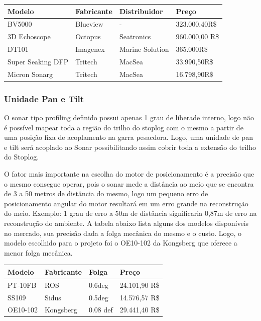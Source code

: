 \begin{center}
    \begin{tabular}{| l | l | l | l | }
    \hline
	{\bf Modelo} & 	{\bf Fabricante} &		{\bf Distribuidor}	&	{\bf Preço} \\  \hline
	BV5000 &			Blueview&				- &					323.000,40R{\$} \\  \hline
	3D Echoscope&	Octopus&		 		Seatronics&			960.000,00 R{\$} \\  \hline
	DT101&			Imagenex&			Marine Solution&	365.000R{\$} \\  \hline
	Super Seaking DFP&		Tritech&				MacSea&			33.990,50R{\$} \\ \hline
	Micron Sonarg &		Tritech&				MacSea&			16.798,90R{\$} \\ \hline

\hline 
\end{tabular}
\end{center}


\subsubsection{Unidade Pan e Tilt}

O sonar tipo profiling definido possui apenas 1 grau de liberade interno, logo não é possível mapear toda a região do trilho do stoplog com o mesmo a partir de uma posição fixa de acoplamento na garra pesacdora. Logo, uma unidade de pan e tilt será acoplado ao Sonar possibilitando assim cobrir toda a extensão do trilho do Stoplog. 

O fator mais importante na escolha do motor de posicionamento é a precisão que o mesmo consegue operar, pois o sonar mede a distância ao meio que se encontra de 3 a 50 metros de distância do mesmo, logo um pequeno erro de posicionamento angular do motor resultará em um erro grande na reconstrução do meio. Exemplo: 1 grau de erro a 50m de distância significaria 0,87m de erro na reconstrução do ambiente. A tabela abaixo lista alguns dos modelos disponíveis no mercado, sua precisão dada a folga mecânica do mesmo e o custo.  Logo, o modelo escolhido para o projeto foi o OE10-102 da Kongsberg que oferece a menor folga mecânica.

\begin{center}
    \begin{tabular}{| l | l | l | l | }
    \hline
	{\bf Modelo} & 	{\bf Fabricante} &		{\bf Folga}	&	{\bf Preço} \\  \hline
	PT-10FB &			ROS&				0.6deg &		24.101,90 R{\$} \\  \hline
	SS109&				Sidus&				 0.5deg&			14.576,57 R{\$} \\  \hline
	OE10-102&			Kongsberg&			0.08 def&	 		29.441,40 R{\$} \\  \hline

\hline 
\end{tabular}
\end{center}

